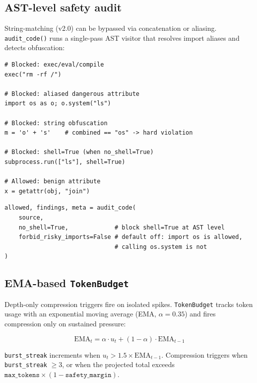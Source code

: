 \documentclass[11pt, a4paper]{article}
\begin{document}
\subsection{AST-level safety audit}


String-matching (v2.0) can be bypassed via concatenation or aliasing.
\texttt{audit\_code()} runs a single-pass AST visitor that resolves import aliases
and detects obfuscation:

\begin{lstlisting}[caption={Detects what string-matching cannot}]
# Blocked: exec/eval/compile
exec("rm -rf /")

# Blocked: aliased dangerous attribute
import os as o; o.system("ls")

# Blocked: string obfuscation
m = 'o' + 's'    # combined == "os" -> hard violation

# Blocked: shell=True (when no_shell=True)
subprocess.run(["ls"], shell=True)

# Allowed: benign attribute
x = getattr(obj, "join")
\end{lstlisting}

\begin{lstlisting}[caption={Public API for the auditor}]
allowed, findings, meta = audit_code(
    source,
    no_shell=True,             # block shell=True at AST level
    forbid_risky_imports=False # default off: import os is allowed,
                               # calling os.system is not
)
\end{lstlisting}

\subsection{EMA-based \texttt{TokenBudget}}


Depth-only compression triggers fire on isolated spikes. \texttt{TokenBudget}
tracks token usage with an exponential moving average (EMA, $\alpha = 0.35$)
and fires compression only on sustained pressure:

\[
\text{EMA}_t = \alpha \cdot u_t + (1 - \alpha) \cdot \text{EMA}_{t-1}
\]

\texttt{burst\_streak} increments when $u_t > 1.5 \times \text{EMA}_{t-1}$.
Compression triggers when \texttt{burst\_streak} $\geq 3$, or when the projected
total exceeds $\texttt{max\_tokens} \times (1 - \texttt{safety\_margin})$.
\end{document}
